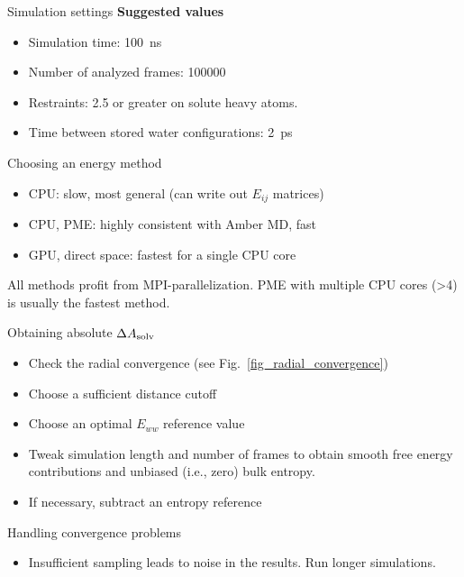 \documentclass[9pt,tutorial,pubversion]{livecoms}
\begin{document}
\begin{Checklists}[H]
	
	\begin{checklist}{Simulation settings}
		\textbf{Suggested values}
		\begin{itemize}
			\item Simulation time: \qty{100}{\nano\second}
			\item Number of analyzed frames: \num{100000}
			\item Restraints: \qty{2.5}{\kcalPerMolASqr} or greater on solute heavy atoms.
            \item Time between stored water configurations: \qty{2}{\pico\second}
		\end{itemize}
	\end{checklist}
	
	\begin{checklist}{Choosing an energy method}
		\begin{itemize}
			\item CPU: slow, most general (can write out $E_{ij}$ matrices)
			\item CPU, PME: highly consistent with Amber MD, fast
			\item GPU, direct space: fastest for a single CPU core
		\end{itemize}
	   
	All methods profit from MPI-parallelization.   
	PME with multiple CPU cores (>4) is usually the fastest method.
	\end{checklist}
	
	\begin{checklist}{Obtaining absolute $\Delta A_\textup{solv}$}
		\begin{itemize}
			\item Check the radial convergence (see Fig.~\ref{fig_radial_convergence})
			\item Choose a sufficient distance cutoff
			\item Choose an optimal $E_{ww}$ reference value
			\item Tweak simulation length and number of frames to obtain smooth free energy contributions and unbiased (i.e., zero) bulk entropy.
			\item If necessary, subtract an entropy reference
		\end{itemize}
	\end{checklist}
	
	\begin{checklist}{Handling convergence problems}
		\begin{itemize}
			\item Insufficient sampling leads to noise in the results. Run longer simulations.
			
		\end{itemize}
	\end{checklist}
	
	
\end{Checklists}
\end{document}
